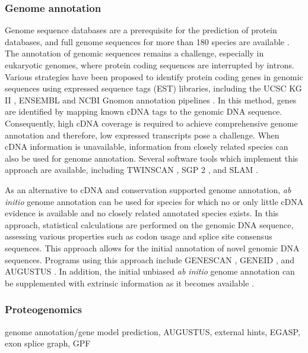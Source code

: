 \subsubsection{Genome annotation}

Genome sequence databases are a prerequisite for the prediction of protein 
databases, and full genome sequences for more than 180 species are available
\citep{Yates2009}.
The annotation of genomic sequences remains a challenge, especially in
eukaryotic genomes, where protein coding sequences are interrupted by
introns.
Various strategies have been proposed to identify protein coding genes in
genomic sequences using expressed sequence tags (EST) libraries, 
including the UCSC KG II \citep{Karolchik2003}, ENSEMBL \citep{Hubbard2005} 
and NCBI Gnomon annotation pipelines \citep{Maglott2005}.
In this method, genes are identified by mapping known cDNA tags to the
genomic DNA sequence.
Consequently, high cDNA coverage is required to achieve comprehensive
genome annotation and therefore, low expressed transcripts pose a challenge.
When cDNA information is unavailable, information from closely related
species can also be used for genome annotation.
Several software tools which implement this approach are available,
including TWINSCAN \citep{Korf2001}, SGP 2 \citep{Parra2003}, and 
SLAM \citep{Cawley2003}.

As an alternative to cDNA and conservation supported genome annotation,
{\em ab initio} genome annotation can be used for species for which no
or only little cDNA evidence is available and no closely related annotated
species exists.
In this approach, statistical calculations are performed on the genomic
DNA sequence, assessing various properties such as codon usage and splice 
site consensus sequences.
This approach allows for the initial annotation of novel genomic DNA 
sequences.
Programs using this approach include GENESCAN \citep{Burge1997}, 
GENEID \citep{Parra2000}, and AUGUSTUS \citep{Stanke2004, Stanke2006}.
In addition, the initial unbiased {\em ab initio} genome annotation can be 
supplemented with extrinsic information as it becomes available 
\citep{Stanke2008}.

\subsubsection{Proteogenomics}

\begin{todo}
genome annotation/gene model prediction, AUGUSTUS, external hints, 
EGASP, exon splice graph, GPF
\end{todo}

